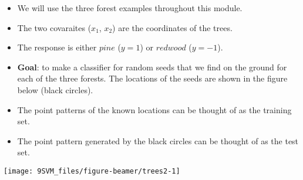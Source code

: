 \documentclass[10pt,ignorenonframetext,]{beamer}
\begin{document}
\begin{frame}

\begin{itemize}
\item
  We will use the three forest examples throughout this module.
\item
  The two covaraites (\(x_1\), \(x_2\)) are the coordinates of the
  trees.
\item
  The response is either \(pine\) (\(y=1\)) or \(redwood\) (\(y=-1\)).
\item
  \textbf{Goal}: to make a classifier for random seeds that we find on
  the ground for each of the three forests. The locations of the seeds
  are shown in the figure below (black circles).
\end{itemize}

\end{frame}

\begin{frame}

\begin{itemize}
\item
  The point patterns of the known locations can be thought of as the
  training set.
\item
  The point pattern generated by the black circles can be thought of as
  the test set.
\end{itemize}

\vspace{4mm}

\begin{center}\texttt{[image: 9SVM\_files/figure-beamer/trees2-1]} \end{center}

\end{frame}
\end{document}
